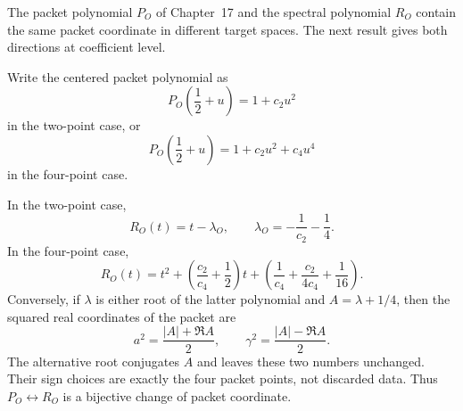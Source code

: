 The packet polynomial \(P_O\) of Chapter~17 and the spectral polynomial
\(R_O\) contain the same packet coordinate in different target spaces.  The
next result gives both directions at coefficient level.

\begin{proposition}
\label{prop:spc-packet-spectral-coefficient-conversion}
Write the centered packet polynomial as
\[
 P_O\left(\frac12+u\right)=1+c_2u^2
\]
in the two-point case, or
\[
 P_O\left(\frac12+u\right)=1+c_2u^2+c_4u^4
\]
in the four-point case.

In the two-point case,
\begin{equation}
\label{eq:spc-critical-coefficient-conversion}
 R_O(t)=t-\lambda_O,
 \qquad
 \lambda_O=-\frac1{c_2}-\frac14.
\end{equation}
In the four-point case,
\begin{equation}
\label{eq:spc-quartic-coefficient-conversion}
 R_O(t)
 =
 t^2+\left(\frac{c_2}{c_4}+\frac12\right)t
 +\left(\frac1{c_4}+\frac{c_2}{4c_4}+\frac1{16}\right).
\end{equation}
Conversely, if \(\lambda\) is either root of the latter polynomial and
\(A=\lambda+1/4\), then the squared real coordinates of the packet are
\begin{equation}
\label{eq:spc-spectral-coordinate-inverse}
 a^2=\frac{|A|+\Re A}{2},
 \qquad
 \gamma^2=\frac{|A|-\Re A}{2}.
\end{equation}
The alternative root conjugates \(A\) and leaves these two numbers unchanged.
Their sign choices are exactly the four packet points, not discarded data.
Thus \(P_O\leftrightarrow R_O\) is a bijective change of packet coordinate.
\end{proposition}

